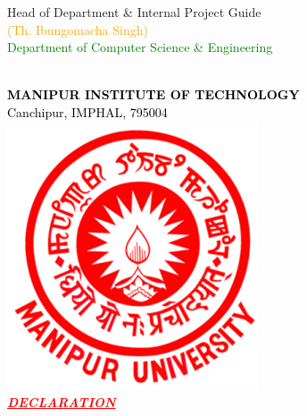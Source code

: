 \documentclass[12pt, oneside, a4paper]{book}
\begin{document}
\vspace{7em}

\begingroup
       \begin{flushright}
        \begin{minipage}{0.6\textwidth}
            \centering
            Head of Department \& Internal Project Guide \\
            \vspace{1em}
            \textcolor{orange}{(Th. Ibungomacha Singh) \\}
            \textcolor{green}{Department of Computer Science \& Engineering}
        \end{minipage}
    \end{flushright}
\endgroup

\newpage
\begingroup
    \begin{center}
        \textcolor{black}
        {
        \color{red}\large {}\\
        \normalsize \textbf{MANIPUR INSTITUTE OF TECHNOLOGY}\\
        \normalsize Canchipur, IMPHAL, 795004\\[1em]
        \includegraphics[scale=0.4]{graphics/MU Logo.png}\\[0.5em]
        }
        \textcolor{red}
        {
        \large \textit{\underline{\textbf{DECLARATION}}}
        }
    \end{center}
\endgroup
\end{document}
